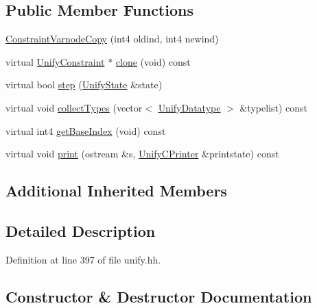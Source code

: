 \subsection*{Public Member Functions}
\begin{DoxyCompactItemize}
\item 
\mbox{\hyperlink{class_constraint_varnode_copy_a00b3daf6c1e160b51a58c2c51028705b}{Constraint\+Varnode\+Copy}} (int4 oldind, int4 newind)
\item 
virtual \mbox{\hyperlink{class_unify_constraint}{Unify\+Constraint}} $\ast$ \mbox{\hyperlink{class_constraint_varnode_copy_a8334114ed67c5c1e1d7655d9b69bb603}{clone}} (void) const
\item 
virtual bool \mbox{\hyperlink{class_constraint_varnode_copy_afa111c6ea8baf57393ba9d503612e036}{step}} (\mbox{\hyperlink{class_unify_state}{Unify\+State}} \&state)
\item 
virtual void \mbox{\hyperlink{class_constraint_varnode_copy_a0464a597c40914b39af05ed2099a52b6}{collect\+Types}} (vector$<$ \mbox{\hyperlink{class_unify_datatype}{Unify\+Datatype}} $>$ \&typelist) const
\item 
virtual int4 \mbox{\hyperlink{class_constraint_varnode_copy_a6f2879e4817ed326cf7c81090f615881}{get\+Base\+Index}} (void) const
\item 
virtual void \mbox{\hyperlink{class_constraint_varnode_copy_a6341d22e7011e5bba4c1ed7aa4d0b657}{print}} (ostream \&s, \mbox{\hyperlink{class_unify_c_printer}{Unify\+C\+Printer}} \&printstate) const
\end{DoxyCompactItemize}
\subsection*{Additional Inherited Members}


\subsection{Detailed Description}


Definition at line 397 of file unify.\+hh.



\subsection{Constructor \& Destructor Documentation}
\mbox{\label{class_constraint_varnode_copy_a00b3daf6c1e160b51a58c2c51028705b}} 
